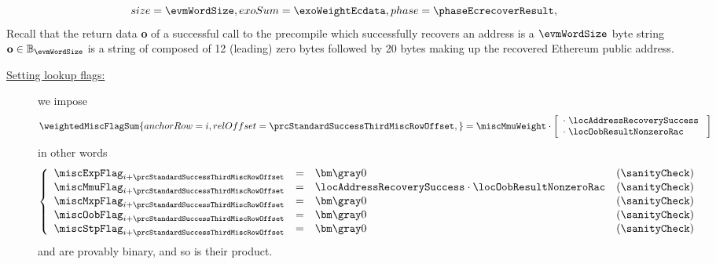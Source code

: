 \begin{description}
\begin{description}
\[{						size      = \evmWordSize                          ,
						exoSum    = \exoWeightEcdata                      ,
						phase     = \phaseEcrecoverResult                 ,
						}
				\]
				\saNote{} Recall that the return data \textbf{o} of a successful call to the \instEcrecover{} precompile which successfully recovers an address is a $\evmWordSize$ byte string $\textbf{o} \in \mathbb{B}_{\evmWordSize}$ is a string of composed of 12 (leading) zero bytes followed by 20 bytes making up the recovered Ethereum public address.
		\end{description}
	\item[\underline{Miscellaneous-row $n^°(i + \prcStandardSuccessThirdMiscRowOffset)$:}]
		\begin{description}
			\item[\underline{Setting lookup flags:}]
				we impose
				\[
					\weightedMiscFlagSum {
						anchorRow = i                                     ,
						relOffset = \prcStandardSuccessThirdMiscRowOffset ,
					}
					=
					\miscMmuWeight
					\cdot
					\left[ \begin{array}{l}
						\cdot \; \locAddressRecoverySuccess   \\
						\cdot \; \locOobResultNonzeroRac      \\
					\end{array} \right]
				\]
				in other words
				\[
					\left\{ \begin{array}{lclc}
						\miscExpFlag _{i + \prcStandardSuccessThirdMiscRowOffset} & = & \gZero                                                   & (\sanityCheck) \\
						\miscMmuFlag _{i + \prcStandardSuccessThirdMiscRowOffset} & = & \locAddressRecoverySuccess \cdot \locOobResultNonzeroRac & (\sanityCheck) \\
						\miscMxpFlag _{i + \prcStandardSuccessThirdMiscRowOffset} & = & \gZero                                                   & (\sanityCheck) \\
						\miscOobFlag _{i + \prcStandardSuccessThirdMiscRowOffset} & = & \gZero                                                   & (\sanityCheck) \\
						\miscStpFlag _{i + \prcStandardSuccessThirdMiscRowOffset} & = & \gZero                                                   & (\sanityCheck) \\
					\end{array} \right.
				\]
				\saNote{}
				\locAddressRecoverySuccess{} and \locOobResultNonzeroRac{} are provably binary, and so is their product.

\end{description}
\end{description}
